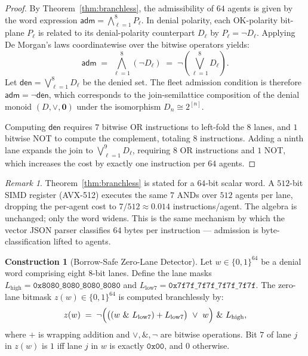 \documentclass[11pt,oneside]{book}
\theoremstyle{definition}
\newtheorem{construction}{Construction}[chapter]
\theoremstyle{plain}
\theoremstyle{remark}
\newtheorem*{remark}{Remark}
\newcommand{\code}[1]{\texttt{#1}}
\begin{document}
\begin{proof}
By Theorem~\ref{thm:branchless}, the admissibility of $64$ agents is given by the word expression $\mathsf{adm} = \bigwedge_{\ell=1}^8 P_\ell$. %
In denial polarity, each OK-polarity bit-plane $P_\ell$ is related to its denial-polarity counterpart $D_\ell$ by $P_\ell = \lnot D_\ell$. %
Applying De Morgan's laws coordinatewise over the bitwise operators yields:
\[
\mathsf{adm} \;=\; \bigwedge_{\ell=1}^8 (\lnot D_\ell) \;=\; \lnot \left( \bigvee_{\ell=1}^8 D_\ell \right).
\]
Let $\mathsf{den} = \bigvee_{\ell=1}^8 D_\ell$ be the denied set. %
The fleet admission condition is therefore $\mathsf{adm} = \lnot \mathsf{den}$, which corresponds to the join-semilattice composition of the denial monoid $(D, \lor, \mathbf{0})$ under the isomorphism $D_n \cong 2^{[n]}$. %

Computing $\mathsf{den}$ requires $7$ bitwise OR instructions to left-fold the $8$ lanes, and $1$ bitwise NOT to compute the complement, totaling $8$ instructions. %
Adding a ninth lane expands the join to $\bigvee_{\ell=1}^9 D_\ell$, requiring $8$ OR instructions and $1$ NOT, which increases the cost by exactly one instruction per $64$ agents. %
\end{proof}

\begin{remark}
Theorem~\ref{thm:branchless} is stated for a $64$-bit scalar word. %
A $512$-bit SIMD register (AVX-512) executes the same $7$ ANDs over $512$ agents per lane, dropping the per-agent cost to $7/512\approx 0.014$ instructions/agent. %
The algebra is unchanged; only the word widens. %
This is the same mechanism by which the vector JSON parser classifies $64$ bytes per instruction --- admission is byte-classification lifted to agents. %
\end{remark}

\begin{construction}[Borrow-Safe Zero-Lane Detector]\label{con:swar}
Let $w\in\{0,1\}^{64}$ be a denial word comprising eight $8$-bit lanes. %
Define the lane masks $L_{\text{high}} = \code{0x8080\_8080\_8080\_8080}$ and $L_{\text{low7}} = \code{0x7f7f\_7f7f\_7f7f\_7f7f}$. %
The zero-lane bitmask $z(w)\in\{0,1\}^{64}$ is computed branchlessly by:
\begin{equation}\label{eq:swar}
z(w)\;=\;\lnot\Bigl(\bigl((w\ \&\ L_{\text{low7}}) + L_{\text{low7}}\bigr) \ \lor\ w\Bigr)\ \&\ L_{\text{high}},
\end{equation}
where $+$ is wrapping addition and $\lor, \&, \lnot$ are bitwise operations. %
Bit $7$ of lane $j$ in $z(w)$ is $1$ iff lane $j$ in $w$ is exactly $\code{0x00}$, and $0$ otherwise. %
\end{construction}
\end{document}
